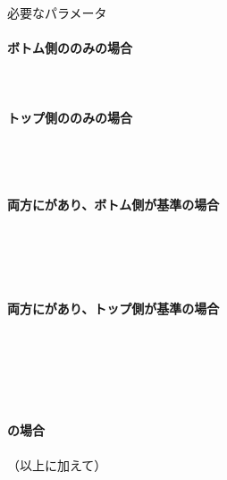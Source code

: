 \begin{Parameter}{必要なパラメータ}
\paragraph*{ボトム側の\Outcut のみの場合}
\PMBottomOutcutAC
\PMBottomOutcutBD
\PMBottomOutcutConerR
\PMBottomOutcutLength\\
\PMBottomEndACID
\PMBottomOutcutAsideThickness
\PMPlatingThk
\tcbline*
\paragraph*{トップ側の\Outcut のみの場合}
\PMTopOutcutAC
\PMTopOutcutBD
\PMTopOutcutCornerR\\
\PMTopOutcutLength
\PMKeywayPos
\PMKeywayWidth\\
\PMTopEndACID
\PMTopOutcutAsideThickness
\PMPlatingThk
\tcbline*
\paragraph*{両方に\Outcut があり、ボトム側が基準の場合}
\PMBottomOutcutAC
\PMBottomOutcutBD
\PMBottomOutcutConerR
\PMBottomOutcutLength\\
\PMBottomEndACID
\PMBottomOutcutAsideThickness
\PMPlatingThk\\
\PMTopOutcutAC
\PMTopOutcutBD
\PMTopOutcutCornerR
\PMTopOutcutLength\\
\PMKeywayPos
\PMKeywayWidth
\PMCenterlineEndFaceDifAC
\tcbline*
\paragraph*{両方に\Outcut があり、トップ側が基準の場合}
\PMTopOutcutAC
\PMTopOutcutBD
\PMTopOutcutCornerR\\
\PMTopOutcutLength
\PMKeywayPos
\PMKeywayWidth\\
\PMTopEndACID
\PMTopOutcutAsideThickness
\PMPlatingThk\\
\PMBottomOutcutAC
\PMBottomOutcutBD
\PMBottomOutcutConerR
\PMBottomOutcutLength\\
\PMCenterlineEndFaceDifAC
\tcbline*
\paragraph*{\CurvedOutcut の場合}
（以上に加えて）\PMCenterCurvatureRadius
\end{Parameter}

